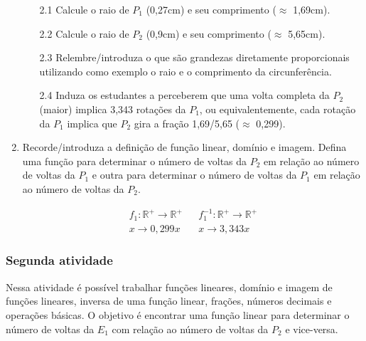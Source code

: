 \documentclass{textolivre}
\begin{document}
\begin{enumerate}
    \begin{enumerate}
    \item[2.1] Calcule o raio de $P_1$ (0,27cm) e seu comprimento ($\approx$ 1,69cm).
    \item[2.2] Calcule o raio de $P_2$ (0,9cm) e seu comprimento ($\approx$ 5,65cm).
    \item[2.3] Relembre/introduza o que são grandezas diretamente proporcionais
    utilizando como exemplo o raio e o comprimento da circunferência.
    \item[2.4] Induza os estudantes a perceberem que uma volta completa da $P_2$
    (maior) implica 3,343 rotações da $P_1$, ou equivalentemente, cada rotação
    da $P_1$ implica que $P_2$ gira a fração 1,69/5,65 ($\approx$ 0,299).
    \end{enumerate}

    \item Recorde/introduza a definição de função linear, domínio e imagem.
    Defina uma função para determinar o número de voltas da $P_2$ em relação ao
    número de voltas da $P_1$ e outra para determinar o número de voltas da
    $P_1$ em relação ao número de voltas da $P_2$.

    \begin{align*}
    f_1: \mathbb{R}^{+} \rightarrow \mathbb{R}^{+} && f_{1}^{-1}: \mathbb{R}^{+} \rightarrow \mathbb{R}^{+} \\
    x \rightarrow 0,299x && x \rightarrow 3,343x \nonumber
    \end{align*}

\end{enumerate}



\subsubsection{Segunda atividade}\label{sec-segunda}
Nessa atividade é possível trabalhar funções lineares, domínio e imagem de
funções lineares, inversa de uma função linear, frações, números decimais e
operações básicas. O objetivo é encontrar uma função linear para determinar o
número de voltas da $E_1$ com relação ao número de voltas da $P_2$ e vice-versa.
\end{document}
